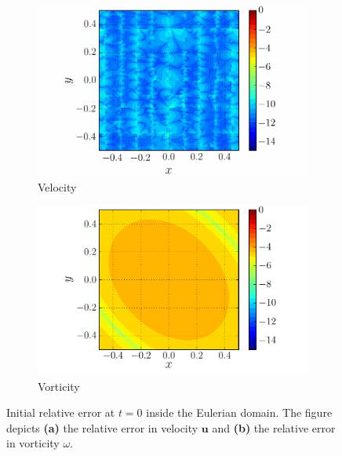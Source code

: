 	\begin{figure}[h]
     \centering
     \begin{subfigure}[t]{0.45\textwidth}
             \includegraphics[width=\linewidth]{./figures/hybrid/lambOseen/lambOseen_fully_vErrorInitial_raster.pdf}
             \caption{Velocity}
             \label{fig:lambOseen_oneway_vErrorInitial}
     \end{subfigure}%
     \qquad %
     \begin{subfigure}[t]{0.45\textwidth}
             \includegraphics[width=\linewidth]{./figures/hybrid/lambOseen/lambOseen_fully_wErrorInitial_compressed.pdf}
             \caption{Vorticity}
             \label{fig:lambOseen_uncoupled_wErrorInitial}
     \end{subfigure}
     \caption{Initial relative error at $t=0$ inside the Eulerian domain. The figure depicts \textbf{(a)} the relative error in velocity $\mathbf{u}$ and \textbf{(b)} the relative error in vorticity $\omega$.}
     \label{fig:lambOseen_initialError}
	\end{figure}
		
